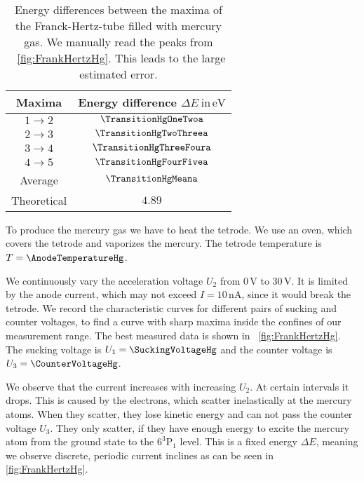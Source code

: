 \documentclass[a4paper,10pt,twocolumn]{article}
\newcommand{\volt}{\, \mathrm{V}}
\newcommand{\eV}{\, \mathrm{eV}}
\newcommand{\HgLevelA}{6^3\mathrm{P}_1}
\newcommand{\TheoreticalTransitionHga}{4.89}
\begin{document}
    \begin{table}[httb]
        \centering
        \begin{tabular}{c c}
            \hline \hline 
            Maxima & Energy difference $\Delta E \ \mathrm{in} \eV$ \\
            \hline
            $1 \rightarrow 2$ & $\TransitionHgOneTwoa$ \\
            $2 \rightarrow 3$ & $\TransitionHgTwoThreea$ \\
            $3 \rightarrow 4$ & $\TransitionHgThreeFoura$\\
            $4 \rightarrow 5$ & $\TransitionHgFourFivea$\\
            \hline
            Average & $\TransitionHgMeana$\\
            Theoretical & $\TheoreticalTransitionHga$ \\
            \hline 
            \hline
        \end{tabular}
        \caption{Energy differences between the maxima of the Franck-Hertz-tube filled with mercury gas.
        We manually read the peaks from ~\autoref{fig:FrankHertzHg}.
        This leads to the large estimated error.
        }
        \label{tab:transitionHg}
    \end{table}
    
    To produce the mercury gas we have to heat the tetrode.
    We use an oven, which covers the tetrode and vaporizes the mercury.
    The tetrode temperature is $T = \AnodeTemperatureHg$.
    
    We continuously vary the acceleration voltage $U_2$ from $0\volt$ to $30\volt$.
    It is limited by the anode current, which 
    may not exceed $I = 10 \, \mathrm{nA}$, since it would break the tetrode.
    We record the characteristic curves for different pairs of sucking and counter voltages, to
    find a curve with sharp maxima inside the confines of our measurement range.
    The best measured data is shown in ~\autoref{fig:FrankHertzHg}.
    The sucking voltage is $U_1 = \SuckingVoltageHg$ and the counter voltage is $U_3 = \CounterVoltageHg$.
    
    We observe that the current increases with increasing $U_2$.
    At certain intervals it drops.
    This is caused by the electrons, which scatter inelastically at the mercury atoms.
    When they scatter, they lose kinetic energy and can not pass the counter voltage $U_3$.
    They only scatter, if they have enough energy to excite the mercury atom from the ground
    state to the $\HgLevelA$ level.
    This is a fixed energy $\Delta E$, meaning we observe discrete, periodic current inclines as
    can be seen in \autoref{fig:FrankHertzHg}.
    
\end{document}

